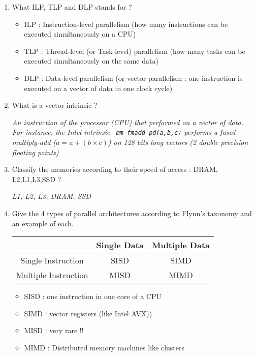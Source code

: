 \documentclass[11pt,a4paper]{article}
\begin{document}
\begin{exercise}
  $~$ %
\begin{enumerate}[label=(\alph*)]
	\item What ILP, TLP and DLP stands for ?

{\it
	\begin{itemize}
		\item {ILP : Instruction-level parallelism (how many instructions can be executed simultaneously on a CPU)}
		\item {TLP : Thread-level (or Task-level) parallelism (how many tasks can be executed simultaneously on the same data)}
		\item {DLP : Data-level parallelism (or vector parallelism : one instruction is executed on a vector of data in one clock cycle)}
	\end{itemize}
}

	\item What is a vector intrinsic ?

{\it
	An instruction of the processor (CPU) that performed on a vector of data. For instance, the Intel intrinsic \texttt{\_mm\_fmadd\_pd(a,b,c)} performs a fused multiply-add ($a = a + (b \times c)$) on 128 bits long vectors (2 double precision floating points)
}


	\item Classify the memories according to their speed of access : DRAM, L2,L1,L3,SSD ?

{\it
	L1, L2, L3, DRAM, SSD
}


	\item Give the 4 types of parallel architectures according to Flynn's taxonomy and an example of each.

{\it
\begin{center}
\begin{tabular}{ |c|c|c| } 
 \hline
  & Single Data & Multiple Data \\ 
\hline
Single Instruction & SISD & SIMD \\
\hline
Multiple Instruction & MISD & MIMD \\
\hline
\end{tabular}
\end{center}


	\begin{itemize}
		\item {SISD : one instruction in one core of a CPU }
		\item {SIMD : vector registers (like Intel AVX))}
		\item {MISD : very rare !!}
		\item {MIMD : Distributed memory machines like clusters }
	\end{itemize}


}

\end{enumerate}
\end{exercise}
\end{document}
